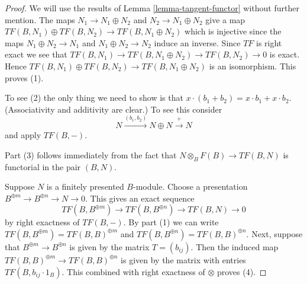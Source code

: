 \documentclass{stacks-project}
\theoremstyle{plain}
\theoremstyle{definition}
\theoremstyle{remark}
\numberwithin{equation}{subsection}
\begin{document}
\begin{proof}
We will use the results of
Lemma \ref{lemma-tangent-functor}
without further mention.
The maps $N_1 \to N_1 \oplus N_2$ and $N_2 \to N_1 \oplus N_2$ give
a map $TF(B, N_1) \oplus TF(B, N_2) \to TF(B, N_1 \oplus N_2)$
which is injective since the maps $N_1 \oplus N_2 \to N_1$ and
$N_1 \oplus N_2 \to N_2$ induce an inverse.
Since $TF$ is right exact we see that
$TF(B, N_1) \to TF(B, N_1 \oplus N_2) \to TF(B, N_2) \to 0$ is exact.
Hence $TF(B, N_1) \oplus TF(B, N_2) \to TF(B, N_1 \oplus N_2)$ is an
isomorphism. This proves (1).

\medskip\noindent
To see (2) the only thing we need to show is that
$x \cdot (b_1 + b_2) = x \cdot b_1 + x \cdot b_2$.
(Associativity and additivity are clear.) To see this consider
$$
N \xrightarrow{(b_1, b_2)} N \oplus N \xrightarrow{+} N
$$
and apply $TF(B, -)$.

\medskip\noindent
Part (3) follows immediately from the fact that
$N \otimes_B F(B) \to TF(B, N)$ is functorial in the pair $(B, N)$.

\medskip\noindent
Suppose $N$ is a finitely presented $B$-module. Choose a presentation
$B^{\oplus m} \to B^{\oplus n} \to N \to 0$. This gives an exact
sequence
$$
TF(B, B^{\oplus m}) \to TF(B, B^{\oplus n}) \to TF(B, N) \to 0
$$
by right exactness of $TF(B, -)$. By part (1) we can write
$TF(B, B^{\oplus m}) = TF(B, B)^{\oplus m}$ and
$TF(B, B^{\oplus n}) = TF(B, B)^{\oplus n}$. Next, suppose that
$B^{\oplus m} \to B^{\oplus n}$ is given by the matrix $T = (b_{ij})$.
Then the induced map $TF(B, B)^{\oplus m} \to TF(B, B)^{\oplus n}$
is given by the matrix with entries $TF(B, b_{ij} \cdot 1_B)$.
This combined with right exactness of $\otimes$ proves (4).
\end{proof}
\end{document}

